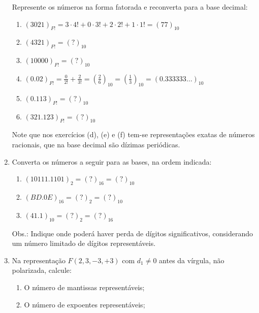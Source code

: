\documentclass[12pt]{article}
\newenvironment{smallitem}{
    \vspace{-2mm}
    \begin{enumerate}
    \setlength{\parskip}{0pt}
    \setlength{\itemsep}{2pt}
}{
    \vspace{-2mm}
    \end{enumerate}
}
\begin{document}
\begin{enumerate}[label=\textbf{\arabic*})]
Represente os números na forma fatorada e reconverta para a base decimal:

\begin{smallitem}

\item $(3021)_{F!} = 3 \cdot 4! + 0 \cdot 3! + 2 \cdot 2! + 1 \cdot 1! =
(77)_{10}$

\item $(4321)_{F!} = (?)_{10}$

\item $(10000)_{F!} = (?)_{10}$

\item $(0.02)_{F!} = \frac{0}{2!} + \frac{2}{3!} = (\frac{2}{6})_{10} =
(\frac{1}{3})_{10} = (0.333333 \dots)_{10}$

\item $(0.113)_{F!} = (?)_{10}$

\item $(321.123)_{F!} = (?)_{10}$

\end{smallitem}

Note que nos exercícios (d), (e) e (f) tem-se representações exatas de números
racionais, que na base decimal são dízimas periódicas.

\item Converta os números a seguir para as bases, na ordem indicada:

\begin{smallitem}

\item $(10111.1101)_2 = (?)_{16} = (?)_{10}$

\item $(BD.0E)_{16} = (?)_2 = (?)_{10}$

\item $(41.1)_{10} = (?)_2 = (?)_{16}$

\end{smallitem}

Obs.: Indique onde poderá haver perda de dígitos significativos, considerando um
número limitado de dígitos representáveis.

\item Na representação $F(2, 3, -3, +3)$ com $d_1 \neq 0$ antes da vírgula, não
polarizada, calcule:

\begin{smallitem}

\item O número de mantissas representáveis;

\item O número de expoentes representáveis;


\end{smallitem}
\end{enumerate}
\end{document}
